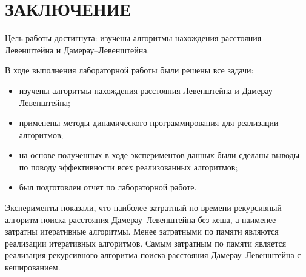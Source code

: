 \section*{ЗАКЛЮЧЕНИЕ}

Цель работы достигнута: изучены алгоритмы нахождения расстояния Левенштейна и Дамерау--Левенштейна.

В ходе выполнения лабораторной работы были решены все задачи:
\begin{itemize}
	\item изучены алгоритмы нахождения расстояния Левенштейна и Дамерау--Левенштейна;
	\item применены методы динамического программирования для реализации алгоритмов;
	\item на основе полученных в ходе экспериментов данных были сделаны выводы по поводу эффективности всех реализованных алгоритмов;
	\item был подготовлен отчет по лабораторной работе.
\end{itemize}

Эксперименты показали, что наиболее затратный по времени рекурсивный алгоритм поиска расстояния Дамерау--Левенштейна без кеша, а наименее затратны итеративные алгоритмы. Менее затратными по памяти являются реализации итеративных алгоритмов. 
Самым затратным по памяти является реализация рекурсивного алгоритма поиска расстояния Дамерау--Левенштейна с кешированием. 